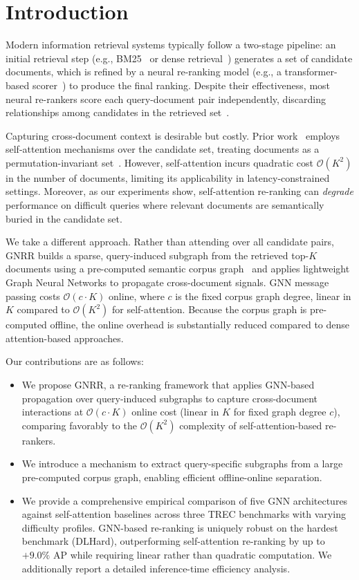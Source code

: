 \documentclass[runningheads]{llncs}
\newcommand{\ModelName}{GNRR\xspace}
\begin{document}
\section{Introduction}
Modern information retrieval systems typically follow a two-stage pipeline: an initial retrieval step (e.g., BM25~\cite{bm25} or dense retrieval~\cite{colbert}) generates a set of candidate documents, which is refined by a neural re-ranking model (e.g., a transformer-based scorer~\cite{tctcolbert,vaswani2017attention}) to produce the final ranking.
Despite their effectiveness, most neural re-rankers score each query-document pair independently, discarding relationships among candidates in the retrieved set~\cite{monobert,RepBert}.

Capturing cross-document context is desirable but costly. Prior work~\cite{pang2020setrank,pobrotyn2020context,pasumarthi2020permutation} employs self-attention mechanisms over the candidate set, treating documents as a permutation-invariant set~\cite{lee2019set,pang2020setrank}. However, self-attention incurs quadratic cost $\mathcal{O}(K^2)$ in the number of documents, limiting its applicability in latency-constrained settings.
Moreover, as our experiments show, self-attention re-ranking can \emph{degrade} performance on difficult queries where relevant documents are semantically buried in the candidate set.

We take a different approach. Rather than attending over all candidate pairs, \ModelName builds a sparse, query-induced subgraph from the retrieved top-$K$ documents using a pre-computed semantic corpus graph~\cite{corpusgraph} and applies lightweight Graph Neural Networks to propagate cross-document signals. GNN message passing costs $\mathcal{O}(c \cdot K)$ online, where $c$ is the fixed corpus graph degree, linear in $K$ compared to $\mathcal{O}(K^2)$ for self-attention. Because the corpus graph is pre-computed offline, the online overhead is substantially reduced compared to dense attention-based approaches.

Our contributions are as follows:
\begin{itemize}
    \item We propose \ModelName, a re-ranking framework that applies GNN-based propagation over query-induced subgraphs to capture cross-document interactions at $\mathcal{O}(c \cdot K)$ online cost (linear in $K$ for fixed graph degree $c$), comparing favorably to the $\mathcal{O}(K^2)$ complexity of self-attention-based re-rankers.
    \item We introduce a mechanism to extract query-specific subgraphs from a large pre-computed corpus graph, enabling efficient offline-online separation.
    \item We provide a comprehensive empirical comparison of five GNN architectures against self-attention baselines across three TREC benchmarks with varying difficulty profiles. GNN-based re-ranking is uniquely robust on the hardest benchmark (DLHard), outperforming self-attention re-ranking by up to $+9.0\%$ AP while requiring linear rather than quadratic computation. We additionally report a detailed inference-time efficiency analysis.
\end{itemize}
\end{document}
